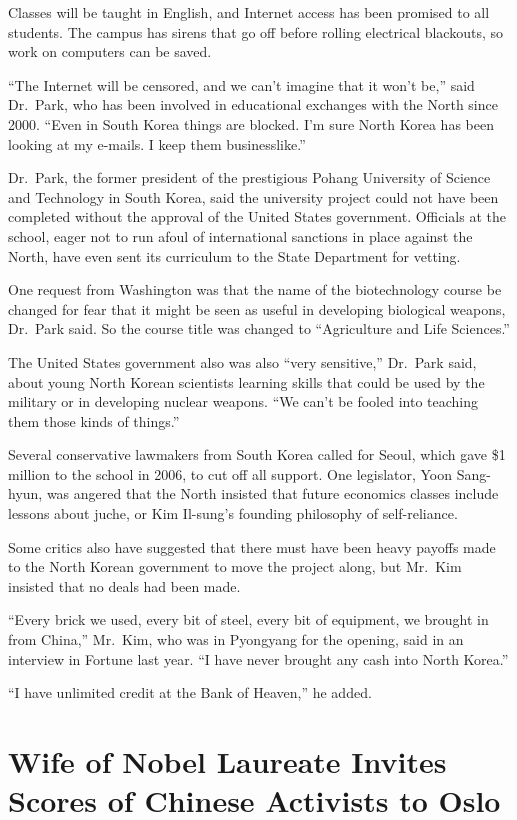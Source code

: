 ﻿\documentclass[12pt]{article}
\begin{document}
Classes will be taught in English, and Internet access has been promised to all students. The campus
has sirens that go off before rolling electrical blackouts, so work on computers can be saved.

``The Internet will be censored, and we can't imagine that it won't be,'' said Dr.~Park, who has
been involved in educational exchanges with the North since 2000. ``Even in South Korea things are
blocked. I'm sure North Korea has been looking at my e-mails. I keep them businesslike.''

Dr.~Park, the former president of the prestigious Pohang University of Science and Technology in
South Korea, said the university project could not have been completed without the approval of the
United States government. Officials at the school, eager not to run afoul of international sanctions
in place against the North, have even sent its curriculum to the State Department for vetting.

One request from Washington was that the name of the biotechnology course be changed for fear that
it might be seen as useful in developing biological weapons, Dr.~Park said. So the course title was
changed to ``Agriculture and Life Sciences.''

The United States government also was also ``very sensitive,'' Dr.~Park said, about young North
Korean scientists learning skills that could be used by the military or in developing nuclear
weapons. ``We can't be fooled into teaching them those kinds of things.''

Several conservative lawmakers from South Korea called for Seoul, which gave \$1 million to the
school in 2006, to cut off all support. One legislator, Yoon Sang-hyun, was angered that the North
insisted that future economics classes include lessons about juche, or Kim Il-sung's founding
philosophy of self-reliance.

Some critics also have suggested that there must have been heavy payoffs made to the North Korean
government to move the project along, but Mr.~Kim insisted that no deals had been made.

``Every brick we used, every bit of steel, every bit of equipment, we brought in from China,''
Mr.~Kim, who was in Pyongyang for the opening, said in an interview in Fortune last year. ``I have
never brought any cash into North Korea.''

``I have unlimited credit at the Bank of Heaven,'' he added.

\section{Wife of Nobel Laureate Invites Scores of Chinese Activists to Oslo}
\end{document}

